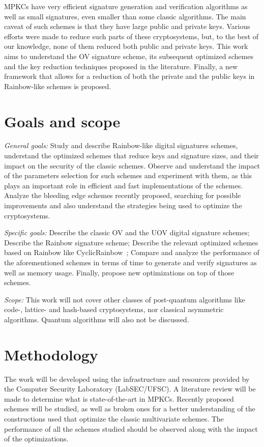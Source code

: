 \documentclass{ufsctex/ufsctex}
\begin{document}
MPKCs have very efficient signature generation and verification algorithms as
well as small signatures, even smaller than some classic algorithms. The main
caveat of such schemes is that they have large public and private keys. Various
efforts were made to reduce such parts of these cryptosystems, but, to the best
of our knowledge, none of them reduced both public and private keys. This work
aims to understand the OV signature scheme, its subsequent optimized schemes
and the key reduction techniques proposed in the literature. Finally, a new
framework that allows for a reduction of both the private and the public keys
in Rainbow-like schemes is proposed.

\section{Goals and scope}

\textit{General goals:} Study and describe Rainbow-like digital signatures
schemes, understand the optimized schemes that reduce keys and signature sizes,
and their impact on the security of the classic schemes. Observe and understand
the impact of the parameters selection for such schemes and experiment with
them, as this plays an important role in efficient and fast implementations of
the schemes. Analyze the bleeding edge schemes recently proposed, searching for
possible improvements and also understand the strategies being used to optimize
the cryptosystems.

\textit{Specific goals:} Describe the classic OV and the UOV digital signature
schemes; Describe the Rainbow signature scheme; Describe the relevant optimized
schemes based on Rainbow like CyclicRainbow~\cite{petzoldt2010cyclicrainbow};
Compare and analyze the performance of the aforementioned schemes in terms of
time to generate and verify signatures as well as memory usage. Finally,
propose new optimizations on top of those schemes.

\textit{Scope:} This work will not cover other classes of post-quantum
algorithms like code-, lattice- and hash-based cryptosystems, nor classical
asymmetric algorithms. Quantum algorithms will also not be discussed.

\section{Methodology}

The work will be developed using the infrastructure and resources provided by
the Computer Security Laboratory (LabSEC/UFSC). A literature review will be
made to determine what is state-of-the-art in MPKCs. Recently proposed schemes
will be studied, as well as broken ones for a better understanding of the
constructions used that optimize the classic multivariate schemes. The
performance of all the schemes studied should be observed along with the impact
of the optimizations.
\end{document}
